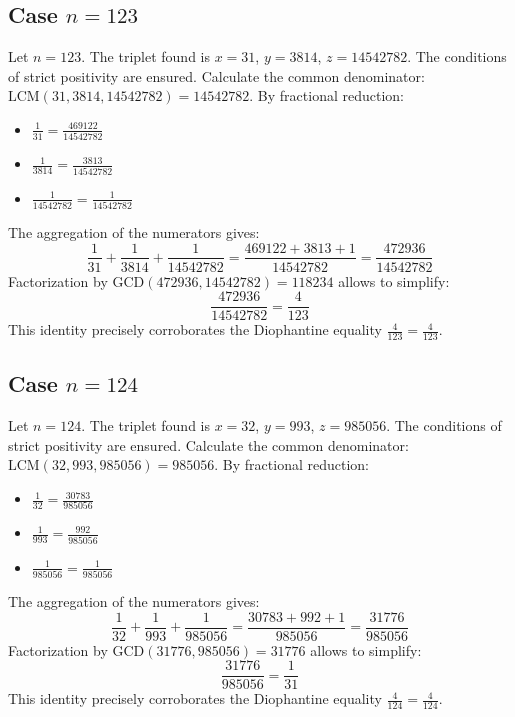 \documentclass[11pt,a4paper]{article}
\begin{document}
\subsection{Case $n = 123$}
Let $n = 123$. The triplet found is $x = 31$, $y = 3814$, $z = 14542782$.
The conditions of strict positivity are ensured.
Calculate the common denominator: $\text{LCM}(31, 3814, 14542782) = 14542782$.
By fractional reduction:
\begin{itemize}
    \item $\frac{1}{31} = \frac{469122}{14542782}$
    \item $\frac{1}{3814} = \frac{3813}{14542782}$
    \item $\frac{1}{14542782} = \frac{1}{14542782}$
\end{itemize}
The aggregation of the numerators gives:
$$ \frac{1}{31} + \frac{1}{3814} + \frac{1}{14542782} = \frac{469122 + 3813 + 1}{14542782} = \frac{472936}{14542782} $$
Factorization by $\text{GCD}(472936, 14542782) = 118234$ allows to simplify:
$$ \frac{472936}{14542782} = \frac{4}{123} $$
This identity precisely corroborates the Diophantine equality $\frac{4}{123} = \frac{4}{123}$.

\subsection{Case $n = 124$}
Let $n = 124$. The triplet found is $x = 32$, $y = 993$, $z = 985056$.
The conditions of strict positivity are ensured.
Calculate the common denominator: $\text{LCM}(32, 993, 985056) = 985056$.
By fractional reduction:
\begin{itemize}
    \item $\frac{1}{32} = \frac{30783}{985056}$
    \item $\frac{1}{993} = \frac{992}{985056}$
    \item $\frac{1}{985056} = \frac{1}{985056}$
\end{itemize}
The aggregation of the numerators gives:
$$ \frac{1}{32} + \frac{1}{993} + \frac{1}{985056} = \frac{30783 + 992 + 1}{985056} = \frac{31776}{985056} $$
Factorization by $\text{GCD}(31776, 985056) = 31776$ allows to simplify:
$$ \frac{31776}{985056} = \frac{1}{31} $$
This identity precisely corroborates the Diophantine equality $\frac{4}{124} = \frac{4}{124}$.
\end{document}

